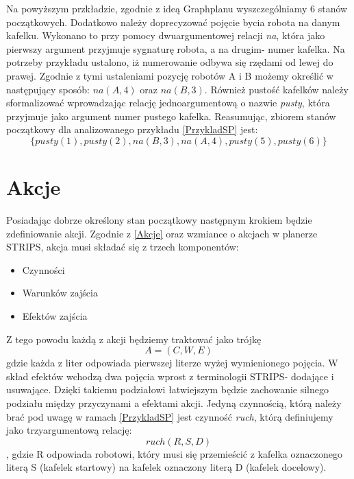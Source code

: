     Na powyższym przkładzie, zgodnie z ideą Graphplanu wyszczególniamy 6 stanów początkowych. Dodatkowo należy doprecyzować pojęcie bycia robota na danym kafelku. Wykonano to 
    przy pomocy dwuargumentowej relacji \textit{na}, która jako pierwszy argument przyjmuje sygnaturę robota, a na drugim- numer kafelka. Na potrzeby przykładu ustalono, iż 
    numerowanie odbywa się rzędami od lewej do prawej. Zgodnie z tymi ustaleniami pozycję robotów A i B możemy określić w następujący sposób: \textit{$na(A,4)$} oraz 
    \textit{$na(B,3)$}. Również pustość kafelków należy sformalizować wprowadzając relację jednoargumentową o nazwie \textit{pusty}, która przyjmuje jako argument numer
    pustego kafelka. Reasumując, zbiorem stanów początkowy dla analizowanego przykładu \ref{PrzykladSP} jest: 
    \begin{equation}
        \{pusty(1),pusty(2),na(B,3),na(A,4),pusty(5),pusty(6)\}
        \label{ZbiorPoczatkowy}
    \end{equation}
\section{Akcje}
    \label{RozdzialAkcje}
    Posiadając dobrze określony stan początkowy następnym krokiem będzie zdefiniowanie akcji. Zgodnie z \ref{Akcje} oraz wzmiance o akcjach w planerze STRIPS,
    akcja musi składać się z trzech komponentów:
    \begin{itemize}
        \item Czynności
        \item Warunków zajścia
        \item Efektów zajścia
    \end{itemize}
    Z tego powodu każdą z akcji będziemy traktować jako trójkę 
    \begin{equation}
        A=(C,W,E)
    \end{equation}
    gdzie każda z liter odpowiada pierwszej literze wyżej wymienionego pojęcia. 
    W skład efektów wchodzą dwa pojęcia wprost z terminologii STRIPS- dodające i usuwające. Dzięki takiemu podziałowi łatwiejszym będzie 
    zachowanie silnego podziału między przyczynami a efektami akcji. 
    Jedyną czynnością, którą należy brać pod uwagę w ramach \ref{PrzykladSP} jest czynność \textit{ruch}, którą definiujemy jako trzyargumentową relację:
    \begin{equation}
        ruch(R,S,D)
    \end{equation}
    , gdzie R odpowiada robotowi, który musi się przemieścić z kafelka oznaczonego literą S (kafelek startowy) na kafelek oznaczony
    literą D (kafelek docelowy).
    
